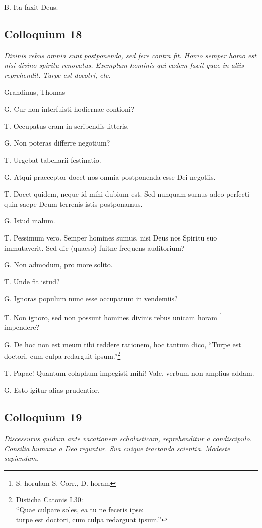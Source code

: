 \documentclass{article}
\begin{document}
B. Ita faxit Deus.

\subsection{Colloquium 18}
\emph{Divinis rebus omnia sunt postponenda, sed fere contra fit. Homo semper homo est nisi divino spiritu renovatus. Exemplum hominis qui eadem facit quae in aliis reprehendit. Turpe est docotri, etc.}

Grandinus, Thomas

G. Cur non interfuisti hodiernae contioni?

T. Occupatus eram in scribendis litteris.

G. Non poteras differre negotium?

T. Urgebat tabellarii festinatio.

G. Atqui praeceptor docet nos omnia postponenda esse Dei negotiis.

T. Docet quidem, neque id mihi dubium est. Sed nunquam sumus adeo perfecti quin saepe Deum terrenis istis postponamus.

G. Istud malum.

T. Pessimum vero. Semper homines sumus, nisi Deus nos Spiritu suo immutaverit. Sed dic (quaeso) fuitne frequens auditorium?

G. Non admodum, pro more solito.

T. Unde fit istud?

G. Ignoras populum nunc esse occupatum in vendemiis?

T. Non ignoro, sed non possunt homines divinis rebus unicam horam \footnote{S. horulam S. Corr., D. horam} impendere?

G. De hoc non est meum tibi reddere rationem, hoc tantum dico, ``Turpe est doctori, cum culpa redarguit ipsum.''\footnote{Disticha Catonis I.30:\\ ``Quae culpare soles, ea tu ne feceris ipse:
\\turpe est doctori, cum culpa redarguat ipsum.''}

T. Papae! Quantum colaphum impegisti mihi! Vale, verbum non amplius addam.

G. Esto igitur alias prudentior.

\subsection{Colloquium 19}
\emph{Discessurus quidam ante vacationem scholasticam, reprehenditur a condiscipulo. Consilia humana a Deo reguntur. Sua cuique tractanda scientia. Modeste sapiendum.}
\end{document}
